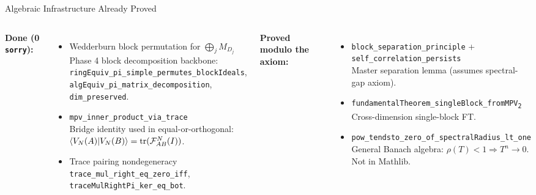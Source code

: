 \documentclass[aspectratio=169,10pt]{beamer}
\begin{document}
\begin{frame}{Algebraic Infrastructure Already Proved}
    \vspace{-0.7em}

    \begin{columns}[T]
        \textbf{\textcolor{leangreen}{Done (0 \texttt{sorry}):}}
        \begin{itemize}\itemsep0.12em\scriptsize
            \item[\textcolor{leangreen}{\checkmark}] Wedderburn block permutation for $\bigoplus_j M_{D_j}$\\
                {\tiny Phase 4 block decomposition backbone:\\
                \texttt{ringEquiv\_pi\_simple\_permutes\_blockIdeals},\\
                \texttt{algEquiv\_pi\_matrix\_decomposition}, \texttt{dim\_preserved}.}
            \item[\textcolor{leangreen}{\checkmark}] \texttt{mpv\_inner\_product\_via\_trace}\\
                {\tiny Bridge identity used in equal-or-orthogonal: $\langle V_N(A)|V_N(B)\rangle = \mathrm{tr}(\mathcal{F}_{AB}^N(I))$.}
            \item[\textcolor{leangreen}{\checkmark}] Trace pairing nondegeneracy\\
                {\tiny \texttt{trace\_mul\_right\_eq\_zero\_iff}, \texttt{traceMulRightPi\_ker\_eq\_bot}.}
        \end{itemize}

        \textbf{\textcolor{amber}{Proved modulo the axiom:}}
        \begin{itemize}\itemsep0.12em\scriptsize
            \item[\textcolor{amber}{$\circ$}] \texttt{block\_separation\_principle} + \texttt{self\_correlation\_persists}\\
                {\tiny Master separation lemma (assumes spectral-gap axiom).}
            \item[\textcolor{leangreen}{\checkmark}] \texttt{fundamentalTheorem\_singleBlock\_fromMPV\textsubscript{2}}\\
                {\tiny Cross-dimension single-block FT.}
            \item[\textcolor{leangreen}{\checkmark}] \texttt{pow\_tendsto\_zero\_of\_spectralRadius\_lt\_one}\\
                {\tiny General Banach algebra: $\rho(T)<1 \Rightarrow T^n\to 0$.\; \textcolor{amber}{Not in Mathlib}.}
        \end{itemize}
    \end{columns}
\end{frame}
\end{document}

